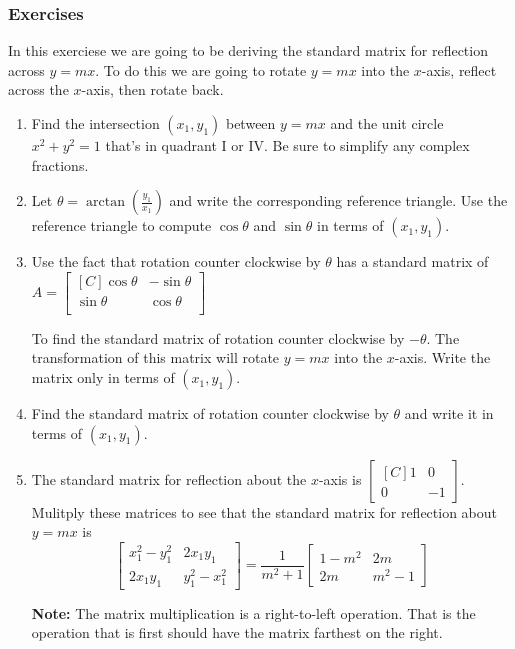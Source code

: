 \subsubsection{Exercises}
\begin{exercise}
In this exerciese we are going to be deriving the standard matrix for reflection across $y=mx$. To do this we are going to rotate $y=mx$ into the $x$-axis, 
reflect across the $x$-axis, then rotate back.
\begin{enumerate}
\item Find the intersection $(x_1,y_1)$ between $y=mx$ and the unit circle $x^2+y^2=1$ that's in quadrant I or IV. Be sure to simplify any complex fractions.
\item Let $\theta=\arctan \left(\frac{y_1}{x_1}\right)$ and write the corresponding reference triangle. Use the reference triangle to compute $\cos \theta$ and $\sin \theta$ in terms of $(x_1,y_1)$.
\item Use the fact that rotation counter clockwise by $\theta$ has a standard matrix of 
$A=\begin{bmatrix*}[C]
\cos \theta & -\sin \theta \\
\sin \theta & \cos \theta \\
\end{bmatrix*}$

To find the standard matrix of rotation counter clockwise by $-\theta$. 
The transformation of this matrix will rotate $y=mx$ into the $x$-axis. Write the matrix only in terms of $(x_1,y_1)$.

\item Find the standard matrix of rotation counter clockwise by $\theta$ and write it in terms of $(x_1,y_1)$.

\item The standard matrix for reflection about the $x$-axis is $\begin{bmatrix*}[C]1 & 0 \\ 0 & -1 \end{bmatrix*}$. Mulitply these matrices to see that the 
standard matrix for reflection about $y=mx$ is 
\[
\begin{bmatrix} x_1^2-y_1^2 & 2x_1y_1 \\ 2x_1y_1 & y_1^2-x_1^2\end{bmatrix}=\frac{1}{m^2+1}\begin{bmatrix} 1-m^2 & 2m \\ 2m & m^2-1\end{bmatrix}
\]

\textbf{Note:} The matrix multiplication is a right-to-left operation. That is the operation that is first should have the matrix farthest on the right.

\end{enumerate}
\end{exercise}
